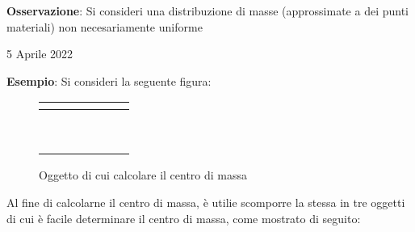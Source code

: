 \documentclass[a4paper]{extarticle}
\begin{document}
\vspace{1em}
\noindent
\textbf{Osservazione}: Si consideri una distribuzione di masse (approssimate a dei punti materiali) non necesariamente uniforme

\newpage
\noindent
\begin{center}
  5 Aprile 2022
\end{center}
\textbf{Esempio}: Si consideri la seguente figura:

\begin{figure}[H]
  \centering
  \begin{tabular}{|c|c|c|c|c|c|c|}
    \hline
    $ $ & $ $ & $ $ & $ $ & $ $ & $ $ & $ $\\
    \hline
    $ $ & \cellcolor{blue!25}$ $ & \cellcolor{blue!25}$ $ & \cellcolor{blue!25}$ $ & \cellcolor{blue!25}$ $ & \cellcolor{blue!25}$ $ & $ $\\
    \hline
    $ $ & \cellcolor{blue!25}$ $ & $ $ & $ $ & $ $ & $ $ & $ $\\
    \hline
    $ $ & \cellcolor{blue!25}$ $ & $ $ & $ $ & $ $ & $ $ & $ $\\
    \hline
    $ $ & \cellcolor{blue!25}$ $ & \cellcolor{blue!25}$ $ & \cellcolor{blue!25}$ $ & $ $ & $ $ & $ $\\
    \hline
    $ $ & \cellcolor{blue!25}$ $ & $ $ & $ $ & $ $ & $ $ & $ $\\
    \hline
    $ $ & \cellcolor{blue!25}$ $ & $ $ & $ $ & $ $ & $ $ & $ $\\
    \hline
    $ $ & \cellcolor{blue!25}$ $ & $ $ & $ $ & $ $ & $ $ & $ $\\
    \hline
    $ $ & \cellcolor{blue!25}$ $ & $ $ & $ $ & $ $ & $ $ & $ $\\
    \hline
    $ $ & $ $ & $ $ & $ $ & $ $ & $ $ & $ $\\
    \hline
  \end{tabular}
  \caption{Oggetto di cui calcolare il centro di massa}
  \label{fig:calcolo_centro_massa_figura}
\end{figure}

\vspace{1em}
\noindent
Al fine di calcolarne il centro di massa, è utilie scomporre la stessa in tre oggetti di cui è facile determinare il centro di massa, come mostrato di seguito:
\end{document}
